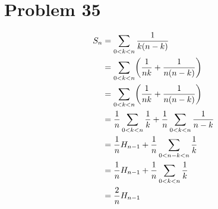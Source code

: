\section*{Problem 35}
\begingroup
\allowdisplaybreaks
\begin{align*}
    S_n & = \sum_{0<k<n} \frac{1}{k(n-k)}                                               \\
        & = \sum_{0<k<n} \brf*{\frac{1}{nk} + \frac{1}{n(n-k)}}                         \\
        & = \sum_{0<k<n} \brf*{\frac{1}{nk} + \frac{1}{n(n-k)}}                         \\
        & = \frac{1}{n}\sum_{0<k<n} \frac{1}{k} + \frac{1}{n}\sum_{0<k<n} \frac{1}{n-k} \\
        & = \frac{1}{n}H_{n-1} + \frac{1}{n} \sum_{0<n-k<n} \frac{1}{k}                 \\
        & = \frac{1}{n}H_{n-1} + \frac{1}{n} \sum_{0<k<n} \frac{1}{k}                   \\
        & = \frac{2}{n}H_{n-1}
\end{align*}
\endgroup